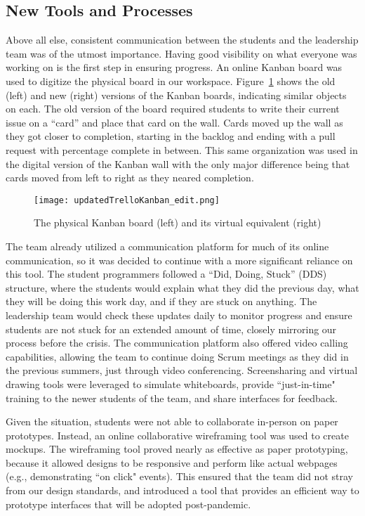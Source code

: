 \subsection{New Tools and Processes}
Above all else, consistent communication between the students and the leadership team was of the utmost importance. Having good visibility on what everyone was working on is the first step in ensuring progress. An online Kanban board was used to digitize the physical board in our workspace. Figure~\ref{fig:digitalkanban} shows the old (left) and new (right) versions of the Kanban boards, indicating similar objects on each. The old version of the board required students to write their current issue on a ``card'' and place that card on the wall. Cards moved up the wall as they got closer to completion, starting in the backlog and ending with a pull request with percentage complete in between. This same organization was used in the digital version of the Kanban wall with the only major difference being that cards moved from left to right as they neared completion.

\begin{figure}[h]
 \centering
 \texttt{[image: updatedTrelloKanban\_edit.png]}
 \caption{The physical Kanban board (left) and its virtual equivalent (right)}
 \label{fig:digitalkanban}
\end{figure}

The team already utilized a communication platform for much of its online communication, so it was decided to continue with a more significant reliance on this tool. The student programmers followed a ``Did, Doing, Stuck'' (DDS) structure, where the students would explain what they did the previous day, what they will be doing this work day, and if they are stuck on anything. The leadership team would check these updates daily to monitor progress and ensure students are not stuck for an extended amount of time, closely mirroring our process before the crisis. The communication platform also offered video calling capabilities, allowing the team to continue doing Scrum meetings as they did in the previous summers, just through video conferencing. Screensharing and virtual drawing tools were leveraged to simulate whiteboards,  provide “just-in-time" training to the newer students of the team, and share interfaces for feedback.

Given the situation, students were not able to collaborate in-person on paper prototypes. Instead, an online collaborative wireframing tool was used to create mockups. The wireframing tool proved nearly as effective as paper prototyping, because it allowed designs to be responsive and perform like actual webpages (e.g., demonstrating ``on click" events). This ensured that the team did not stray from our design standards, and introduced a tool that provides an efficient way to prototype interfaces that will be adopted post-pandemic.

